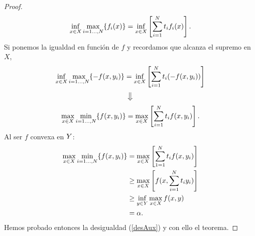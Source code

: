 \begin{proof}
\[
\inf_{x \in X} \max_{i=1\dots,N } \{f_i(x)\} = \inf_{x \in X} \left[ \sum_{i=1}^{N} t_i f_i(x) \right].
\] 
Si ponemos la igualdad en función de $ f $ y recordamos que alcanza el supremo en $ X $,
\[
\inf_{x \in X} \max_{i=1\dots,N } \{-f(x,y_i)\} = \inf_{x \in X} \left[ \sum_{i=1}^{N} t_i (-f(x,y_i)) \right]
\] 
\[
\big\Downarrow
\]
\[
\max_{x \in X} \min_{i=1\dots,N } \{f(x,y_i)\} = \max_{x \in X} \left[ \sum_{i=1}^{N} t_i f(x,y_i) \right]. 
\] 
Al ser $ f $ convexa en $ Y $:
\begin{equation*}
\begin{split}
\max_{x \in X} \min_{i=1\dots,N } \{f(x,y_i)\} &= \max_{x \in X} \left[ \sum_{1=1}^{N} t_i f(x, y_i) \right] \\
&\geq \max_{x \in X} \left[ f(x,\sum_{i=1}^{N} t_i y_i) \right] \\
&\geq \inf_{y \in Y} \max_{x \in X} f(x,y) \\
&= \alpha.
\end{split}
\end{equation*}
Hemos probado entonces la desigualdad (\ref{desAux}) y con ello el teorema.
\end{proof}
\bigskip